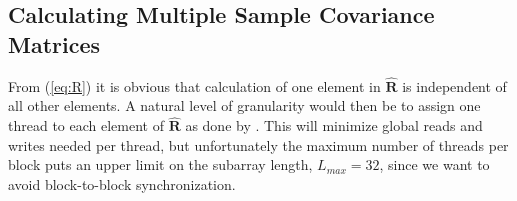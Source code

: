 \documentclass[12pt,journal,onecolumn]{IEEEtran}
\newcommand{\mat}[1]{\mathbf{#1}}
\begin{document}


\subsection{Calculating Multiple Sample Covariance Matrices}\label{sec:calcR}


From (\ref{eq:R}) it is obvious that calculation of one element in $\mat{\hat{R}}$ is independent of all other elements. A natural level of granularity would then be to assign one thread to each element of $\mat{\hat{R}}$ as done by \cite{Chen2011}. This will minimize global reads and writes needed per thread, but unfortunately the maximum number of threads per block puts an upper limit on the subarray length, $L_{max}=32$, since we want to avoid block-to-block synchronization.
\end{document}
